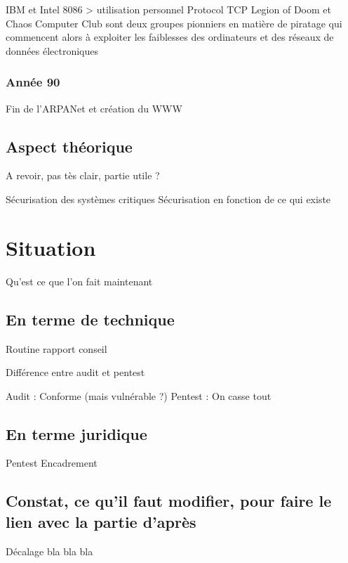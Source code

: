 \documentclass[a4paper]{memoir}
\begin{document}
IBM et Intel 8086 > utilisation personnel
Protocol TCP
Legion of Doom et Chaos Computer Club sont deux groupes pionniers en matière de piratage qui commencent alors à exploiter les faiblesses des ordinateurs et des réseaux de données électroniques

\section{Année 90}

Fin de l'ARPANet et création du WWW

 

\chapter{Aspect théorique}

A revoir, pas tès clair, partie utile ?

Sécurisation des systèmes critiques
Sécurisation en fonction de ce qui existe 

\part{Situation}

Qu'est ce que l'on fait maintenant

\chapter{En terme de technique}

Routine
rapport
conseil

Différence entre audit et pentest

Audit : Conforme (mais vulnérable ?)
Pentest : On casse tout

\chapter{En terme juridique}

Pentest
Encadrement

\chapter{Constat, ce qu'il faut modifier, pour faire le lien avec la partie d'après}

Décalage bla bla bla

\end{document}
